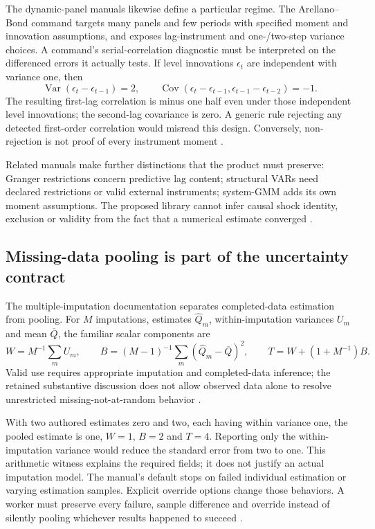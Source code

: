 The dynamic-panel manuals likewise define a particular regime. The
Arellano--Bond command targets many panels and few periods with specified
moment and innovation assumptions, and exposes lag-instrument and
one-/two-step variance choices. A command's serial-correlation diagnostic
must be interpreted on the differenced errors it actually tests. If level
innovations $\epsilon_t$ are independent with variance one, then
\[
 \operatorname{Var}(\epsilon_t-\epsilon_{t-1})=2,\qquad
 \operatorname{Cov}(\epsilon_t-\epsilon_{t-1},
                    \epsilon_{t-1}-\epsilon_{t-2})=-1.
\]
The resulting first-lag correlation is minus one half even under those
independent level innovations; the second-lag covariance is zero. A generic
rule rejecting any detected first-order correlation would misread this
design. Conversely, non-rejection is not proof of every instrument moment
\citep{exec19_dynamic_stata_ab,exec24_stata_choice}.

Related manuals make further distinctions that the product must preserve:
Granger restrictions concern predictive lag content; structural VARs need
declared restrictions or valid external instruments; system-GMM adds its
own moment assumptions. The proposed library cannot infer causal shock
identity, exclusion or validity from the fact that a numerical estimate
converged \citep{exec13_ct_stata_granger,exec13_ct_stata_svar,
exec13_ct_stata_ivsvar,exec19_dynamic_stata_system,exec24_stata_choice}.

\subsection{Missing-data pooling is part of the uncertainty contract}
The multiple-imputation documentation separates completed-data estimation
from pooling. For $M$ imputations, estimates $\widehat Q_m$, within-imputation
variances $U_m$ and mean $\overline Q$, the familiar scalar components are
\[
 W=M^{-1}\sum_m U_m,\qquad
 B=(M-1)^{-1}\sum_m(\widehat Q_m-\overline Q)^2,\qquad
 T=W+(1+M^{-1})B.
\]
Valid use requires appropriate imputation and completed-data inference;
the retained substantive discussion does not allow observed data alone to
resolve unrestricted missing-not-at-random behavior
\citep{exec21_transport_stata_estimate,exec21_transport_stata_substantive}.

With two authored estimates zero and two, each having within variance one,
the pooled estimate is one, $W=1$, $B=2$ and $T=4$. Reporting only the
within-imputation variance would reduce the standard error from two to
one. This arithmetic witness explains the required fields; it does not
justify an actual imputation model. The manual's default stops on failed
individual estimation or varying estimation samples. Explicit override
options change those behaviors. A worker must preserve every failure,
sample difference and override instead of silently pooling whichever
results happened to succeed \citep{exec21_transport_stata_estimate,
exec24_stata_choice}.

